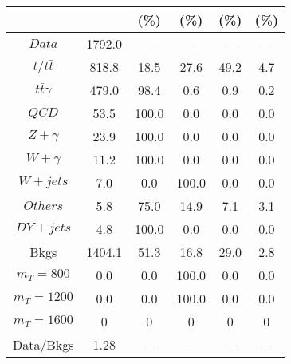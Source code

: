 \begin{figure}
\begin{minipage}[c]{0.32\textwidth}
{\begin{tabular}{cccccc}
 &  & (\%) & (\%) & (\%) & (\%)  \\
\hline
                                                                      $ Data $ &  1792.0 &  --- &  --- &  --- &  ---\\
$ t/t\bar{t} $ &  818.8 &  18.5 &  27.6 &  49.2 &  4.7\\
$ t\bar{t}\gamma $ &  479.0 &  98.4 &  0.6 &  0.9 &  0.2\\
$ QCD $ &  53.5 &  100.0 &  0.0 &  0.0 &  0.0\\
$ Z+\gamma $ &  23.9 &  100.0 &  0.0 &  0.0 &  0.0\\
$ W+\gamma $ &  11.2 &  100.0 &  0.0 &  0.0 &  0.0\\
$ W+jets $ &  7.0 &  0.0 &  100.0 &  0.0 &  0.0\\
$ Others $ &  5.8 &  75.0 &  14.9 &  7.1 &  3.1\\
$ DY+jets $ &  4.8 &  100.0 &  0.0 &  0.0 &  0.0\\
Bkgs &  1404.1 &  51.3 &  16.8 &  29.0 &  2.8\\
$ m_{T} = 800 $ &  0.0 &  0.0 &  100.0 &  0.0 &  0.0\\
$ m_{T} = 1200 $ &  0.0 &  0.0 &  100.0 &  0.0 &  0.0\\
$ m_{T} = 1600 $ &  0 &  0 &  0 &  0 &  0\\
Data/Bkgs &  1.28 &  --- &  --- &  --- &  ---\\
\hline
\end{tabular}
}
\end{minipage}
\end{figure}

